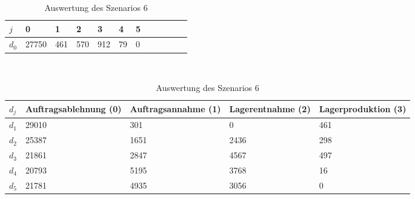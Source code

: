 \begin{table}[h!]
\renewcommand{\arraystretch}{1.5}
  \begin{center}
    \caption{Auswertung des Szenarios 6}  \label{AS6}
    \vspace*{3mm}
    \begin{tabular}{l l l l l l l l l l l l }  \hline 
         $j$ & 0 & 1  & 2 & 3 & 4  & 5   \\  \hline
$d_{0}$ &  27750 &  461 &  570 &  912 &  79 &  0 \\
\hline
    \end{tabular} \\[3mm]
        \begin{tabular}{ l p{2.5cm} p{2.5cm} p{2.5cm} p{2.5cm} }   \hline    %
    $d_j$ & Auftrags\-ablehnung (0) & Auftrags\-annahme (1)  & Lager\-entnahme (2) & Lager\-produktion (3)\\\hline 
$d_1$ &  29010 &   301 &   0 &  461 \\
$d_2$ &  25387 &  1651 &  2436 &  298 \\
$d_3$ &  21861 &  2847 &  4567 &  497 \\
$d_4$ &  20793 &  5195 &  3768 &   16 \\
$d_5$ &  21781 &  4935 &  3056 &  0 \\
          \hline
   \end{tabular} \\[3mm]
     \end{center}
\end{table}


